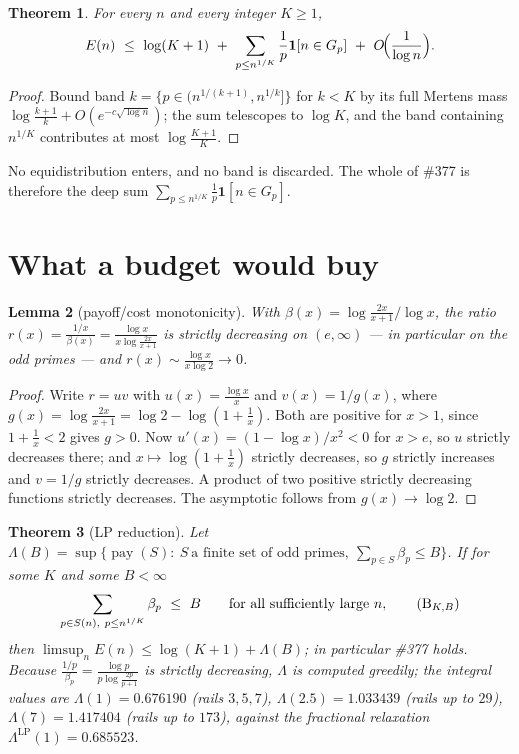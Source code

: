 \documentclass[11pt]{article}
\newtheorem{theorem}{Theorem}
\newtheorem{lemma}[theorem]{Lemma}
\begin{document}
\begin{theorem}\label{thm:trunc}
For every $n$ and every integer $K\ge1$,
\[
  E(n)\ \le\ \log(K+1)\ +\ \sum_{p\le n^{1/K}}\frac1p\mathbf 1[n\in G_p]
  \ +\ O\!\Bigl(\frac1{\log n}\Bigr).
\]
\end{theorem}

\begin{proof}
Bound band $k=\{p\in(n^{1/(k+1)},n^{1/k}]\}$ for $k<K$ by its full Mertens mass
$\log\frac{k+1}{k}+O(e^{-c\sqrt{\log n}})$; the sum telescopes to $\log K$, and
the band containing $n^{1/K}$ contributes at most $\log\frac{K+1}{K}$.
\end{proof}

No equidistribution enters, and no band is discarded.  The whole of \#377 is
therefore the deep sum $\sum_{p\le n^{1/K}}\frac1p\mathbf1[n\in G_p]$.

\section{What a budget would buy}

\begin{lemma}[payoff/cost monotonicity]\label{lem:ratio}
With $\beta(x)=\log\frac{2x}{x+1}/\log x$, the ratio
$r(x)=\frac{1/x}{\beta(x)}=\frac{\log x}{x\log\frac{2x}{x+1}}$ is strictly
decreasing on $(e,\infty)$ --- in particular on the odd primes --- and
$r(x)\sim\frac{\log x}{x\log2}\to0$.
\end{lemma}

\begin{proof}
Write $r=uv$ with $u(x)=\frac{\log x}{x}$ and $v(x)=1/g(x)$, where
$g(x)=\log\frac{2x}{x+1}=\log2-\log(1+\frac1x)$.  Both are positive for $x>1$,
since $1+\frac1x<2$ gives $g>0$.  Now $u'(x)=(1-\log x)/x^2<0$ for $x>e$, so
$u$ strictly decreases there; and $x\mapsto\log(1+\frac1x)$ strictly decreases,
so $g$ strictly increases and $v=1/g$ strictly decreases.  A product of two
positive strictly decreasing functions strictly decreases.  The asymptotic
follows from $g(x)\to\log2$.
\end{proof}

\begin{theorem}[LP reduction]\label{thm:lp}
Let $\Lambda(B)=\sup\{\operatorname{pay}(S):\ S\ \text{a finite set of odd primes},\
\sum_{p\in S}\beta_p\le B\}$.  If for some $K$ and some $B<\infty$
\[
  \sum_{p\in S(n),\ p\le n^{1/K}}\beta_p\ \le\ B
  \qquad\text{for all sufficiently large }n,
  \tag{$\mathrm B_{K,B}$}
\]
then $\limsup_n E(n)\le\log(K+1)+\Lambda(B)$; in particular \#377 holds.
Because $\frac{1/p}{\beta_p}=\frac{\log p}{p\log\frac{2p}{p+1}}$ is strictly
decreasing, $\Lambda$ is computed greedily; the integral values are
$\Lambda(1)=0.676190$ (rails $3,5,7$), $\Lambda(2.5)=1.033439$ (rails up to
$29$), $\Lambda(7)=1.417404$ (rails up to $173$), against the fractional
relaxation $\Lambda^{\mathrm{LP}}(1)=0.685523$.
\end{theorem}
\end{document}
